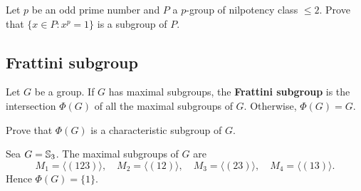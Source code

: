 
\begin{exercise}
\label{xca:class2_torsion}
Let $p$ be an odd prime number and 
$P$ a $p$-group of nilpotency class $\leq2$. 
Prove that $\{x\in P:x^p=1\}$ is a subgroup of $P$.
\end{exercise}



\subsection{Frattini subgroup}

\begin{definition}
Let $G$ be a group. If $G$ has maximal subgroups, 
the \textbf{Frattini subgroup} is the intersection 
$\Phi(G)$ of all the maximal subgroups of $G$. 
Otherwise, 
$\Phi(G)=G$. 
\end{definition}

\begin{exercise}
\label{xca:Phi(G)char}
Prove that $\Phi(G)$ is a characteristic subgroup of $G$. 
\end{exercise}

\begin{example}
Sea $G=\mathbb{S}_3$. The maximal subgroups of $G$ are 
\[
M_1=\langle (123)\rangle,
\quad
M_2=\langle (12)\rangle,
\quad
M_3=\langle (23)\rangle,
\quad
M_4=\langle (13)\rangle.
\]
Hence $\Phi(G)=\{1\}$. 
\end{example}

